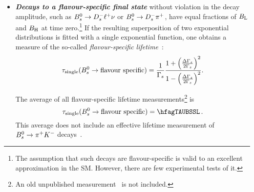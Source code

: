 \afterpage{\clearpage}

\begin{itemize}
\item 
{\bf\em Decays to a flavour-specific final state}
without \CP violation in the decay amplitude,
such as $B^0_s \to D_s^- \ell^+ \nu$
or $B^0_s\to D_s^- \pi^+$, have equal 
fractions of $B_{\rm L}$ and $B_{\rm H}$ at time zero.\footnote{%
The assumption that such decays are flavour-specific is valid to an excellent approximation in the SM.
However, there are few experimental tests of it.}
If the resulting superposition of two exponential distributions
is fitted with a single exponential function, 
one obtains a measure of the so-called {\em flavour-specific lifetime}~\cite{Hartkorn:1999ga}:
\begin{equation}
\tau_{\rm single}(\Bs\to \mbox{flavour specific}) = \frac{1}{\Gs}
\frac{{1+\left(\frac{\DGs}{2\Gs}\right)^2}}{{1-\left(\frac{\DGs}{2\Gs}\right)^2}
}.
\labe{fslife}
\end{equation}

The average of all flavour-specific 
\Bs lifetime measurements\footnote{%
An old unpublished measurement~\cite{CDFnote7757:2005} is not included.}
is
\begin{equation}
\tau_{\rm single}(\Bs\to \mbox{flavour specific}) = \hfagTAUBSSL \,.
\labe{tau_fs}
\end{equation}
This average does not include an effective lifetime measurement of 
$B^0_s \to \pi^+K^-$ decays~\cite{Aaij:2014fia,*Aaij:2012ns_cont}.


\end{itemize}
